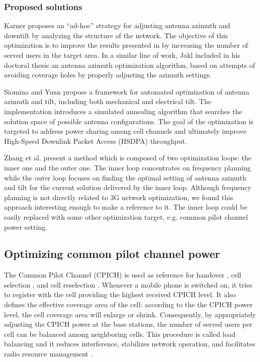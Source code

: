 \subsubsection{Proposed solutions}

Karner \cite{MSc.antenna.optimization:2003} proposes an ``ad-hoc''
strategy for adjusting antenna azimuth and downtilt by analyzing the
structure of the network. The objective of this optimization is to
improve the results presented in \cite{Antenna.tilt.and.CPICH:2003}
by increasing the number of served users in the target area. In a
similar line of work, Jakl \cite{Jakl:PhD} included in his doctoral
thesis an antenna azimuth optimization algorithm, based on attempts
of avoiding coverage holes by properly adjusting the azimuth settings.

Siomina and Yuan \cite{Antenna.Configuration:2008} propose a framework
for automated optimization of antenna azimuth and tilt, including
both mechanical and electrical tilt. The implementation introduces
a simulated annealing algorithm that searches the solution space of
possible antenna configurations. The goal of the optimization is targeted
to address power sharing among cell channels and ultimately improve
High-Speed Downlink Packet Access (HSDPA) \cite{wiki:hsdpa} throughput.

Zhang et al. \cite{Antenna.azimuth.tilt:2009} present a method which
is composed of two optimization loops: the inner one and the outer
one. The inner loop concentrates on frequency planning while the outer
loop focuses on finding the optimal setting of antenna azimuth and
tilt for the current solution delivered by the inner loop. Although
frequency planning is not directly related to 3G network optimization,
we found this approach interesting enough to make a reference to it.
The inner loop could be easily replaced with some other optimization
target, e.g. common pilot channel power setting.


\subsection{Optimizing common pilot channel power}

The Common Pilot Channel (CPICH) is used as reference for handover
\cite{umts_world:handover}, cell selection \cite{3glteinfo:cellSelection},
and cell reselection \cite{flore2005:cell_reselection}. Whenever
a mobile phone is switched on, it tries to register with the cell
providing the highest received CPICH level. It also defines the effective
coverage area of the cell: according to the the CPICH power level,
the cell coverage area will enlarge or shrink. Consequently, by appropriately
adjusting the CPICH power at the base stations, the number of served
users per cell can be balanced among neighboring cells. This procedure
is called load balancing and it reduces interference, stabilizes network
operation, and facilitates radio resource management \cite{WCDMAforUMTS_RadioAccessForThirdGenerationMobileCommunications}.


